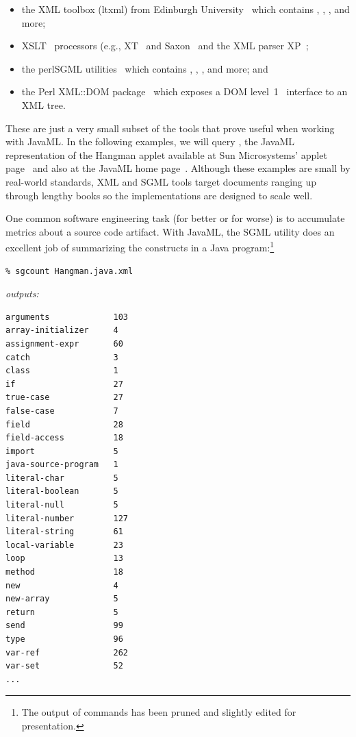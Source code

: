 \documentclass{article}
\begin{document}
\begin{multicols}{2}
\begin{itemize}
\item the XML toolbox (ltxml) from Edinburgh University~\cite{ltxml}
which contains ,
, , and more;

\item XSLT~\cite{XSLT} processors (e.g., XT~\cite{Clark-XT} and Saxon~\cite{Saxon}
      and the XML parser XP~\cite{Clark-XP};

\item the perlSGML utilities~\cite{perlSGML} which
contains , ,
, and more; and

\item the Perl XML::DOM package~\cite{perlDOM} which exposes a
DOM level~1~\cite{DOM} interface to an XML tree.

\end{itemize}

These are just a very small subset of the tools that prove useful when
working with JavaML.  In the following examples, we will query
, the JavaML representation of the Hangman
applet available at Sun Microsystems' applet page~\cite{SunApplets} and
also at the JavaML home page~\cite{Badros-javaml}.  Although these examples
are small by real-world standards, XML and SGML tools target documents
ranging up through lengthy books so the implementations are designed to
scale well.

One common software engineering task (for better or for worse) is to
accumulate metrics about a source code artifact.  With JavaML, the SGML
utility  does an excellent job of summarizing the
constructs in a Java program:\footnote{The output of commands has been
  pruned and slightly edited for presentation.}


{\bfseries
\begin{verbatim}
% sgcount Hangman.java.xml
\end{verbatim}
}
\noindent\emph{outputs:}
{\small
\begin{verbatim}
arguments             103
array-initializer     4
assignment-expr       60
catch                 3
class                 1
if                    27
true-case             27
false-case            7
field                 28
field-access          18
import                5
java-source-program   1
literal-char          5
literal-boolean       5
literal-null          5
literal-number        127
literal-string        61
local-variable        23
loop                  13
method                18
new                   4
new-array             5
return                5
send                  99
type                  96
var-ref               262
var-set               52
...
\end{verbatim}
}


\end{multicols}
\end{document}
